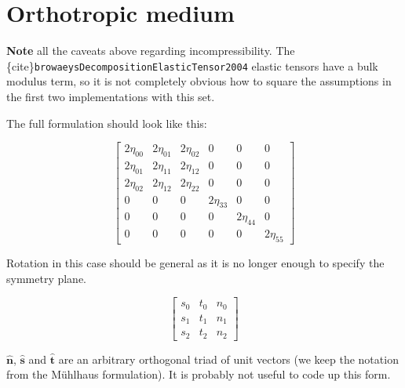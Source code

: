 \documentclass[
  letterpaper,
  DIV=11,
  numbers=noendperiod]{scrreprt}
\begin{document}
\begin{verbatim}
\end{verbatim}

\section{Orthotropic medium}\label{orthotropic-medium}

\textbf{Note} all the caveats above regarding incompressibility. The
\{cite\}\texttt{browaeysDecompositionElasticTensor2004} elastic tensors
have a bulk modulus term, so it is not completely obvious how to square
the assumptions in the first two implementations with this set.

The full formulation should look like this:

\[\left[\begin{matrix}2 \eta_{00} & 2 \eta_{01} & 2 \eta_{02} & 0 & 0 & 0\\2 \eta_{01} & 2 \eta_{11} & 2 \eta_{12} & 0 & 0 & 0\\2 \eta_{02} & 2 \eta_{12} & 2 \eta_{22} & 0 & 0 & 0\\0 & 0 & 0 & 2 \eta_{33} & 0 & 0\\0 & 0 & 0 & 0 & 2 \eta_{44} & 0\\0 & 0 & 0 & 0 & 0 & 2 \eta_{55}\end{matrix}\right]\]

Rotation in this case should be general as it is no longer enough to
specify the symmetry plane.

\[\left[\begin{matrix}s_{0} & t_{0} & n_{0}\\s_{1} & t_{1} & n_{1}\\s_{2} & t_{2} & n_{2}\end{matrix}\right]\]

\(\hat{\mathbf{n}}\), \(\hat{\mathbf{s}}\) and \(\hat{\mathbf{t}}\) are
an arbitrary orthogonal triad of unit vectors (we keep the notation from
the Mühlhaus formulation). It is probably not useful to code up this
form.
\end{document}
